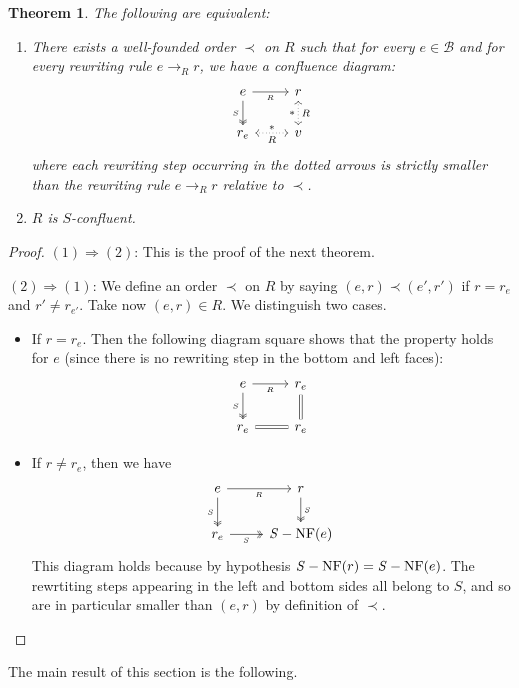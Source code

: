 \documentclass[10pt]{easychair}
\newtheorem{theorem}{Theorem}[section]
\theoremstyle{definition}
\newcommand\basis{\mathscr{B}}
\newcommand\rewR{\to_R}
\DeclareMathOperator{\SNF}{{\it S}-NF}
\begin{document}
\begin{theorem}
  The following are equivalent:
  \begin{enumerate}
    \item There exists a well-founded order $\prec$ on $R$ such that for every $e\in\basis$ and for every rewriting rule
  $e\rewR r$, we have a confluence diagram:
  \[\begin{tikzcd}
  e\ar[r, "_R"']\ar[d, twoheadrightarrow, "_S"'] & r\ar[d, leftrightarrow, dotted, "*"', "R"]\\
  r_e\ar[r, leftrightarrow, dotted, "*", "R"'] & v
  \end{tikzcd}\]
  where each rewriting step occurring in the dotted arrows is strictly smaller
  than the rewriting rule $e\rewR r$ relative to $\prec$.
\item $R$ is $S$-confluent.
  \end{enumerate}
\end{theorem}
\begin{proof}
  $(1) \Rightarrow (2)$: This is the proof of the next theorem.

  $(2) \Rightarrow (1)$: We define an order $\prec$ on $R$ by saying $(e,r) \prec (e',r')$ if $r = r_e$ and $r' \neq r_{e'}$. Take now $(e,r) \in R$. We distinguish two cases.
  \begin{itemize}
  \item If $r = r_e$. Then the following diagram square shows that the property holds for $e$ (since there is no rewriting step in the bottom and left faces):
     \[\begin{tikzcd}
  e\ar[r, "_R"']\ar[d, twoheadrightarrow, "_S"'] & r_e \ar[equal, d]\\
  r_e\ar[r, equal] & r_e
\end{tikzcd}\]
\item If $r \neq r_e$, then we have
       \[\begin{tikzcd}
  e\ar[r, "_R"']\ar[d, twoheadrightarrow, "_S"'] & r \ar[twoheadrightarrow, , "_S", d] \\
  r_e\ar[r, twoheadrightarrow, "_S"'] & \SNF (e)
\end{tikzcd}\]
This diagram holds because by hypothesis $\SNF(r) = \SNF(e)$. The rewrtiting steps appearing in the left and bottom sides all belong to $S$, and so are in particular smaller than $(e,r)$ by definition of $\prec$.
  \end{itemize}
\end{proof}

The main result of this section is the following.
\medskip
\end{document}
